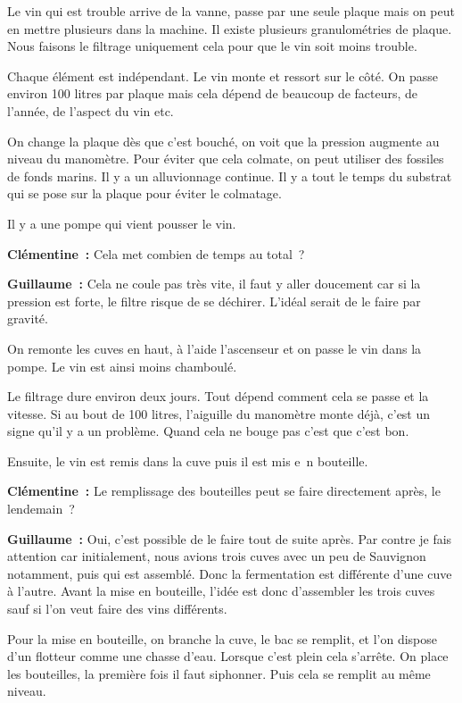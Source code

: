 \documentclass[a4paper, titlepage]{report}
\begin{document}
Le vin qui est trouble arrive de la
vanne, passe par une seule plaque mais on peut en mettre plusieurs dans
la machine. Il existe plusieurs granulométries de plaque. Nous faisons
le filtrage uniquement cela pour que le vin soit moins trouble.

Chaque élément est indépendant. Le vin monte et ressort sur le côté. On
passe environ 100 litres par plaque mais cela dépend de beaucoup de
facteurs, de l'année, de l'aspect du vin etc.

On change la plaque dès que c'est bouché, on voit que la pression
augmente au niveau du manomètre. Pour éviter que cela colmate, on peut
utiliser des fossiles de fonds marins. Il y a un alluvionnage continue.
Il y a tout le temps du substrat qui se pose sur la plaque pour éviter
le colmatage.

Il y a une pompe qui vient pousser le vin.

\textbf{Clémentine~:} Cela met combien de temps au total~?

\textbf{Guillaume~:} Cela ne coule pas très vite, il faut y aller
doucement car si la pression est forte, le filtre risque de se déchirer.
L'idéal serait de le faire par gravité.

On remonte les cuves en haut, à l'aide l'ascenseur et on passe le vin
dans la pompe. Le vin est ainsi moins chamboulé.

Le filtrage dure environ deux jours. Tout dépend comment cela se passe
et la vitesse. Si au bout de 100 litres, l'aiguille du manomètre monte
déjà, c'est un signe qu'il y a un problème. Quand cela ne bouge pas
c'est que c'est bon.

Ensuite, le vin est remis dans la cuve puis il est mis e~n bouteille.

\textbf{Clémentine~:} Le remplissage des bouteilles peut se faire
directement après, le lendemain~?

\textbf{Guillaume~:} Oui, c'est possible de le faire tout de suite
après. Par contre je fais attention car initialement, nous avions trois
cuves avec un peu de Sauvignon notamment, puis qui est assemblé. Donc la
fermentation est différente d'une cuve à l'autre. Avant la mise en
bouteille, l'idée est donc d'assembler les trois cuves sauf si l'on veut
faire des vins différents.

Pour la mise en bouteille, on branche la cuve, le bac se remplit, et
l'on dispose d'un flotteur comme une chasse d'eau. Lorsque c'est plein
cela s'arrête. On place les bouteilles, la première fois il faut
siphonner. Puis cela se remplit au même niveau.
\end{document}
